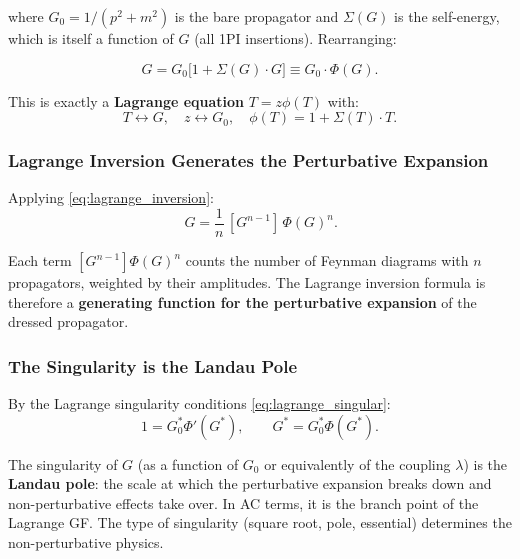 \documentclass[11pt,a4paper]{article}
\theoremstyle{definition}
\begin{document}
where $G_0 = 1/(p^2 + m^2)$ is the bare propagator and $\Sigma(G)$ is the
self-energy, which is itself a function of $G$ (all 1PI insertions).
Rearranging:

\begin{equation}
  G = G_0\bigl[1 + \Sigma(G) \cdot G\bigr] \equiv G_0 \cdot \Phi(G).
  \label{eq:dse_lagrange}
\end{equation}

This is exactly a \textbf{Lagrange equation} $T = z\phi(T)$ with:
\[
  T \leftrightarrow G, \quad z \leftrightarrow G_0, \quad \phi(T) = 1 + \Sigma(T)\cdot T.
\]

\subsubsection{Lagrange Inversion Generates the Perturbative Expansion}

Applying \eqref{eq:lagrange_inversion}:
\begin{equation}
  [G_0^n]\, G = \frac{1}{n}\,[G^{n-1}]\,\Phi(G)^n.
  \label{eq:dse_li}
\end{equation}

Each term $[G^{n-1}]\Phi(G)^n$ counts the number of Feynman diagrams with
$n$ propagators, weighted by their amplitudes. The Lagrange inversion formula
is therefore a \textbf{generating function for the perturbative expansion} of
the dressed propagator.

\subsubsection{The Singularity is the Landau Pole}

By the Lagrange singularity conditions \eqref{eq:lagrange_singular}:
\[
  1 = G_0^* \Phi'(G^*), \qquad G^* = G_0^* \Phi(G^*).
\]

The singularity of $G$ (as a function of $G_0$ or equivalently of the coupling
$\lambda$) is the \textbf{Landau pole}: the scale at which the perturbative
expansion breaks down and non-perturbative effects take over. In AC terms, it
is the branch point of the Lagrange GF. The type of singularity (square root,
pole, essential) determines the non-perturbative physics.
\end{document}
